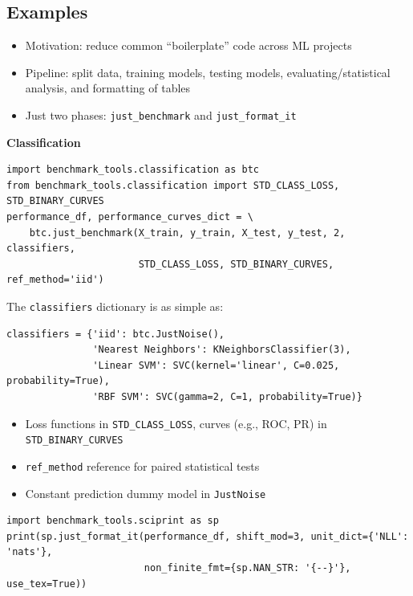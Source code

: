 \documentclass[a0,landscape]{a0poster}
\newcommand{\mysection}[1]{\section*{\fontsize{67.1}{82} \selectfont \color{NavyBlue} #1 \color{Black}}}
\newcommand{\code}{\texttt}
\newcommand{\sectionx}{\textbf}
\begin{document}
\begin{multicols}{2}

\Large

\mysection{Examples}

\begin{itemize}
  \item Motivation: reduce common ``boilerplate'' code across ML projects
  \item Pipeline: split data, training models, testing models, evaluating/statistical analysis, and formatting of tables
  \item Just two phases: \code{just\_benchmark} and \code{just\_format\_it}
\end{itemize}

\sectionx{Classification}
{\normalsize
\begin{verbatim}
import benchmark_tools.classification as btc
from benchmark_tools.classification import STD_CLASS_LOSS, STD_BINARY_CURVES
performance_df, performance_curves_dict = \
    btc.just_benchmark(X_train, y_train, X_test, y_test, 2, classifiers,
                       STD_CLASS_LOSS, STD_BINARY_CURVES, ref_method='iid')
\end{verbatim}
}
The \code{classifiers} dictionary is as simple as:
{\normalsize
\begin{verbatim}
classifiers = {'iid': btc.JustNoise(),
               'Nearest Neighbors': KNeighborsClassifier(3),
               'Linear SVM': SVC(kernel='linear', C=0.025, probability=True),
               'RBF SVM': SVC(gamma=2, C=1, probability=True)}
\end{verbatim}
}
\begin{itemize}
  \item Loss functions in \code{STD\_CLASS\_LOSS}, curves (e.g., ROC, PR) in \code{STD\_BINARY\_CURVES}
  \item \code{ref\_method} reference for paired statistical tests
  \item Constant prediction dummy model in \code{JustNoise}
\end{itemize}
{\normalsize
\begin{verbatim}
import benchmark_tools.sciprint as sp
print(sp.just_format_it(performance_df, shift_mod=3, unit_dict={'NLL': 'nats'},
                        non_finite_fmt={sp.NAN_STR: '{--}'}, use_tex=True))
\end{verbatim}
}
\begin{center}
{\footnotesize
\setlength{\tabcolsep}{0.75em} %
\begin{tabular}{|l|l|r|l|r|l|r|l|r|l|r|l|r|l|r|}

\end{tabular}}
\end{center}
\end{multicols}
\end{document}
